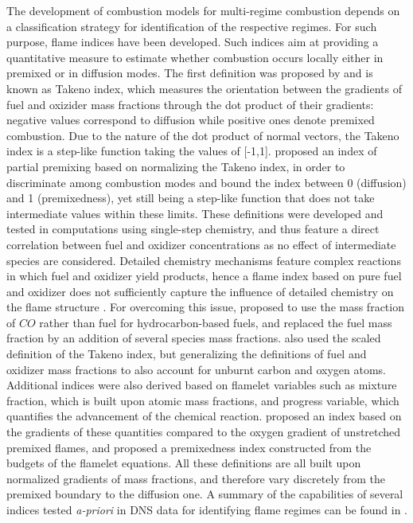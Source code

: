 \documentclass[preprint,12pt,authoryear]{elsarticle}
\begin{document}
The development of combustion models for multi-regime combustion depends on a classification strategy for identification of the respective regimes. For such purpose, flame indices have been developed. Such indices aim at providing a quantitative measure to estimate whether combustion occurs locally either in premixed or in diffusion modes. The first definition was proposed by \cite{yamashita_numerical_1996} and is known as Takeno index, which measures the orientation between the gradients of fuel and oxizider mass fractions through the dot product of their gradients: negative values correspond to diffusion while positive ones denote premixed combustion. Due to the nature of the dot product of normal vectors, the Takeno index is a step-like function taking the values of [-1,1]. \cite{domingo_partially_2002} proposed an index of partial premixing based on normalizing the Takeno index, in order to discriminate among combustion modes and bound the index between 0 (diffusion) and 1 (premixedness), yet still being a step-like function that does not take intermediate values within these limits. These definitions were developed and tested in computations using single-step chemistry, and thus feature a direct correlation between fuel and oxidizer concentrations as no effect of intermediate species are considered. Detailed chemistry mechanisms feature complex reactions in which fuel and oxidizer yield products, hence a flame index based on pure fuel and oxidizer does not sufficiently capture the influence of detailed chemistry on the flame structure \citep{fiorina_approximating_2005}. For overcoming this issue, \cite{som_effects_2010} proposed to use the mass fraction of $CO$ rather than fuel for hydrocarbon-based fuels, and \cite{wan_alkali_2019} replaced the fuel mass fraction by an addition of several species mass fractions. \cite{zhao_computational_2020} also used the scaled definition of the Takeno index, but generalizing the definitions of fuel and oxidizer mass fractions to also account for unburnt carbon and oxygen atoms. Additional indices were also derived based on flamelet variables such as mixture fraction, which is built upon atomic mass fractions, and progress variable, which quantifies the advancement of the chemical reaction. \cite{fiorina_approximating_2005} proposed an index based on the gradients of these quantities compared to the oxygen gradient of unstretched premixed flames, and \cite{knudsen_general_2009} proposed a premixedness index constructed from the budgets of the flamelet equations. All these definitions are all built upon normalized gradients of mass fractions, and therefore vary discretely from the premixed boundary to the diffusion one. A summary of the capabilities of several indices tested \textsl{a-priori} in DNS data for identifying flame regimes can be found in \cite{zirwes_identification_2021}. 
\end{document}
